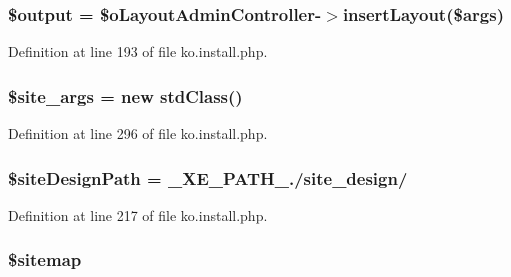 \subsubsection[{\texorpdfstring{\$output}{$output}}]{\setlength{\rightskip}{0pt plus 5cm}\$output = \$o\+Layout\+Admin\+Controller-\/$>$insert\+Layout(\$args)}\hypertarget{ko_8install_8php_a73004ce9cd673c1bfafd1dc351134797}{}\label{ko_8install_8php_a73004ce9cd673c1bfafd1dc351134797}


Definition at line 193 of file ko.\+install.\+php.

\subsubsection[{\texorpdfstring{\$site\+\_\+args}{$site_args}}]{\setlength{\rightskip}{0pt plus 5cm}\$site\+\_\+args = new std\+Class()}\hypertarget{ko_8install_8php_a19e0fcfacd69155c9cc255e5500f6ccc}{}\label{ko_8install_8php_a19e0fcfacd69155c9cc255e5500f6ccc}


Definition at line 296 of file ko.\+install.\+php.

\subsubsection[{\texorpdfstring{\$site\+Design\+Path}{$siteDesignPath}}]{\setlength{\rightskip}{0pt plus 5cm}\$site\+Design\+Path = \+\_\+\+X\+E\+\_\+\+P\+A\+T\+H\+\_\+./site\+\_\+design/\textquotesingle{}}\hypertarget{ko_8install_8php_a0b79a974b91157b79d83cc0be7e3247c}{}\label{ko_8install_8php_a0b79a974b91157b79d83cc0be7e3247c}


Definition at line 217 of file ko.\+install.\+php.

\subsubsection[{\texorpdfstring{\$sitemap}{$sitemap}}]{\setlength{\rightskip}{0pt plus 5cm}\$sitemap}\hypertarget{ko_8install_8php_ae7b8fee391a6d8b9162de5b69b9dc07f}{}\label{ko_8install_8php_ae7b8fee391a6d8b9162de5b69b9dc07f}


